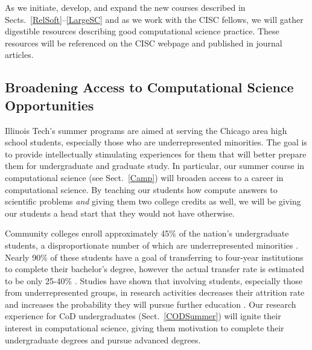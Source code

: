 \documentclass[11pt]{NSFamsart}
\begin{document}
As we initiate, develop, and expand the new courses described in Sects.~\ref{RelSoft}--\ref{LargeSC} and as we work with the CISC fellows, we will gather digestible resources describing good computational science practice. These resources will be referenced on the CISC webpage and published in journal articles. 

\subsection{Broadening Access to Computational Science Opportunities}
Illinois Tech's summer programs are aimed at serving the Chicago area high school students, especially those who are underrepresented minorities.  The goal is to provide intellectually stimulating experiences for them that will better prepare them for undergraduate and graduate study. 
In particular, our  summer course in computational science (see Sect.~\ref{Camp}) will broaden access to a career in computational science.  By teaching our students how compute answers to scientific problems \emph{and} giving them two college credits as well, we will be giving our students a head start that they would not have otherwise.

Community colleges enroll approximately 45\% of the nation's undergraduate students, a disproportionate number of which are underrepresented minorities \cite{KnappKG12,nsfreport13}.  Nearly 90\% of these students have a goal of transferring to four-year institutions to complete their bachelor's degree, however the actual transfer rate is estimated to be only 25-40\% \cite{HoachlanderSH03,MelguizoKA11}.  Studies have shown that involving students, especially those from underrepresented groups, in  research activities decreases  their attrition rate and increases the probability they will pursue further education \cite{BarlowV04,JonesBV10}.  Our research experience for CoD undergraduates (Sect.~\ref{CODSummer}) will ignite their interest in computational science, giving them motivation to complete their undergraduate degrees and pursue advanced degrees.
\end{document}
